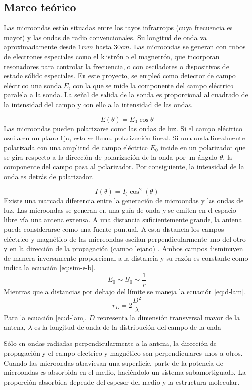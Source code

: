 \documentclass[spanish,notitlepage,letterpaper, 12pt]{article}
\begin{document}
\subsection{Marco teórico} \label{I.MT}
Las microondas están situadas entre los rayos infrarrojos (cuya frecuencia es mayor) y
las ondas de radio convencionales. Su longitud de onda va aproximadamente desde $1
mm$ hasta $30 cm$. Las microondas se generan con tubos de electrones especiales como el
klistrón o el magnetrón, que incorporan resonadores para controlar la frecuencia, o con
osciladores o dispositivos de estado sólido especiales. En este proyecto, se empleó
como detector de campo eléctrico una sonda $E$, con la que se mide la componente del
campo eléctrico paralela a la sonda. La señal de salida de la sonda es proporcional al
cuadrado de la intensidad del campo y con ello a la intensidad de las ondas.\par
\begin{equation}
    E(\theta)=E_0\cos{\theta}
\end{equation}
Las microondas pueden polarizarse como las ondas de luz. Si el campo eléctrico oscila en
un plano fijo, esto se llama polarización lineal. Si una onda linealmente polarizada con una
amplitud de campo eléctrico $E_0$ incide en un polarizador que se gira respecto a la dirección
de polarización de la onda por un ángulo $\theta$, la componente del campo pasa al polarizador. Por consiguiente, la intensidad de la onda es detrás de polarizador.\par
\begin{equation}
    I(\theta)=I_0\cos^2(\theta)
\end{equation}
Existe una marcada diferencia entre la generación de microondas y las ondas de luz. Las
microondas se generan en una guía de onda y se emiten en el espacio libre vía una
antena extensa. A una distancia suficientemente grande, la antena puede considerarse
como una fuente puntual. A esta distancia los campos eléctrico y magnético de las
microondas oscilan perpendicularmente uno del otro y en la dirección de la propagación
(campo lejano) \cite{serway_jewett_2017}. Ambos campos disminuyen de manera inversamente proporcional a la
distancia y su razón es constante como indica la ecuación \eqref{eq:sim-e-b}.
\begin{equation}\label{eq:sim-e-b}
    E_0\sim B_0\sim\frac{1}{r}
\end{equation}
Mientras que a distancias por debajo del límite se maneja la ecuación \eqref{eq:d-lam}.
\begin{equation}\label{eq:d-lam}
    r_{D}=2\frac{D^2}{\lambda}
\end{equation}
Para la ecuación \eqref{eq:d-lam}, $D$ representa la dimensión transversal mayor de la antena, $\lambda$ es la longitud de onda de la distribución del campo de la onda\par
\bigskip
Sólo en ondas radiadas perpendicularmente a la antena, la dirección de propagación y el
campo eléctrico y magnético son perpendiculares unos a otros. Cuando las microondas
atraviesan una superficie, parte de la potencia de microondas es absorbida en el medio,
haciéndolo un sistema subamortiguado. La proporción absorbida depende del espesor del
medio y la estructura molecular.\par
\end{document}

